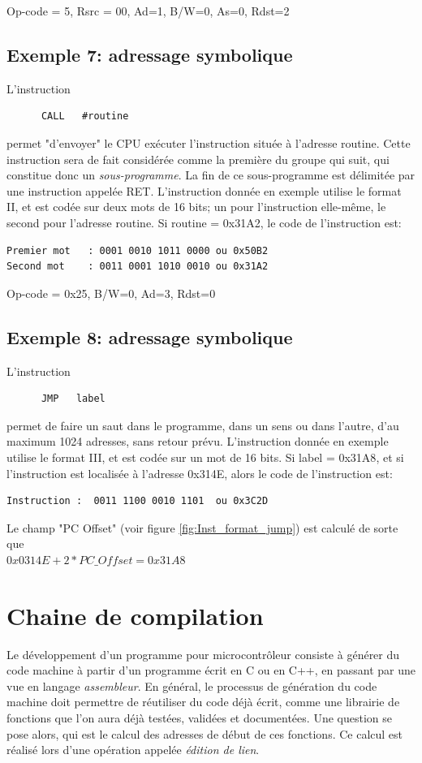 Op-code = 5, Rsrc = 00, Ad=1, B/W=0, As=0, Rdst=2

\subsection{Exemple 7: adressage symbolique}
L'instruction
\lstset{style=customc}
\begin{lstlisting}
      CALL   #routine
\end{lstlisting}
permet "d'envoyer" le CPU exécuter l'instruction située à l'adresse {\selectfont routine}. Cette instruction sera de fait considérée comme la première du groupe qui suit, qui constitue donc un \textit{sous-programme}. La fin de ce sous-programme est délimitée par une instruction appelée {\selectfont RET}.
L'instruction donnée en exemple utilise le format II, et est codée sur deux mots de 16 bits; un pour l'instruction elle-même, le second pour l'adresse {\selectfont routine}.
Si {\selectfont routine = 0x31A2}, le code de l'instruction est:
\lstset{style=customc}
\begin{lstlisting}
Premier mot   : 0001 0010 1011 0000	ou 0x50B2
Second mot    : 0011 0001 1010 0010 ou 0x31A2 
\end{lstlisting}

Op-code = 0x25, B/W=0, Ad=3, Rdst=0

\subsection{Exemple 8: adressage symbolique}
L'instruction
\lstset{style=customc}
\begin{lstlisting}
      JMP   label
\end{lstlisting}
permet de faire un saut dans le programme, dans un sens ou dans l'autre, d'au maximum 1024 adresses, sans retour prévu.
L'instruction donnée en exemple utilise le format III, et est codée sur un mot de 16 bits.
Si {\selectfont label = 0x31A8}, et si l'instruction est localisée à l'adresse 0x314E, alors le code de l'instruction est:
\lstset{style=customc}
\begin{lstlisting}
Instruction :  0011 1100 0010 1101	ou 0x3C2D
\end{lstlisting}
Le champ "PC Offset" (voir figure \ref{fig:Inst_format_jump}) est calculé de sorte que\\
$0x0314E + 2*PC\_Offset = 0x31A8 $

\section{Chaine de compilation}
Le développement d'un programme pour microcontrôleur consiste à générer du code machine à partir d'un programme écrit en C ou en C++, en passant par une vue en langage \textit{assembleur}.
En général, le processus de génération du code machine doit permettre de réutiliser du code déjà écrit, comme une librairie de fonctions que l'on aura déjà testées, validées et documentées. Une question se pose alors, qui est le calcul des adresses de début de ces fonctions. Ce calcul est réalisé lors d'une opération appelée \textit{édition de lien}.

